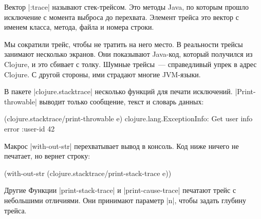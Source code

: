 \begin{english}
\end{english}

Вектор \spverb|:trace| называют стек-трейсом. Это методы Java, по которым прошло
исключение с момента выброса до перехвата. Элемент трейса это вектор с именем
класса, метода, файла и номера строки.

Мы сократили трейс, чтобы не тратить на него место. В реальности трейсы занимают
несколько экранов. Они показывают Java-код, который получился из Clojure, и это
сбивает с толку. Шумные трейсы~--- справедливый упрек в адрес Clojure. С другой
стороны, ими страдают многие JVM-языки.

В пакете \spverb|clojure.stacktrace| несколько функций для печати
исключений. \spverb|Print-throwable| выводит только сообщение, текст и
словарь данных:

\begin{english}
  \begin{clojure}
(clojure.stacktrace/print-throwable e)
clojure.lang.ExceptionInfo: Get user info error
{:user-id 42}
  \end{clojure}
\end{english}

Макрос \spverb|with-out-str| перехватывает вывод в консоль. Код ниже ничего не
печатает, но вернет строку:

\begin{english}
  \begin{clojure}
(with-out-str
  (clojure.stacktrace/print-stack-trace e))
  \end{clojure}
\end{english}

Другие Функции \spverb|print-stack-trace| и \spverb|print-cause-trace| печатают
трейс с небольшими отличиями. Они принимают параметр \spverb|n|, чтобы задать
глубину трейса.

